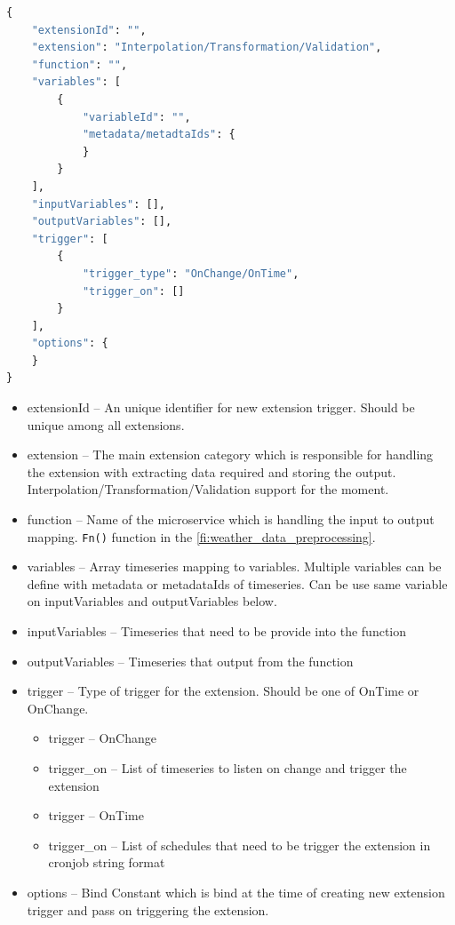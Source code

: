 \begin{lstlisting}[language=Python]
{
    "extensionId": "",
    "extension": "Interpolation/Transformation/Validation",
    "function": "",
    "variables": [
        {
            "variableId": "",
            "metadata/metadtaIds": {
            }
        }
    ],
    "inputVariables": [],
    "outputVariables": [],
    "trigger": [
        {
            "trigger_type": "OnChange/OnTime",
            "trigger_on": []
        }
    ],
    "options": {
    }
}
\end{lstlisting}
\begin{itemize}
    \item extensionId -- An unique identifier for new extension trigger. Should be unique among all extensions.
    \item extension -- The main extension category which is responsible for handling the extension with extracting data required and storing the output. Interpolation/Transformation/Validation support for the moment.
    \item function -- Name of the microservice which is handling the input to output mapping. \texttt{Fn()} function in the \cref{fi:weather_data_preprocessing}.
    \item variables -- Array timeseries mapping to variables. Multiple variables can be define with metadata or metadataIds of timeseries. Can be use same variable on inputVariables and outputVariables below.
    \item inputVariables -- Timeseries that need to be provide into the function
    \item outputVariables -- Timeseries that output from the function
    \item trigger -- Type of trigger for the extension. Should be one of OnTime or OnChange.
    \begin{itemize}
        \item trigger -- OnChange
        \item trigger\_on -- List of timeseries to listen on change and trigger the extension
    \end{itemize}
    \begin{itemize}
        \item trigger -- OnTime
        \item trigger\_on -- List of schedules that need to be trigger the extension in cronjob string format
    \end{itemize}
    \item options -- Bind Constant which is bind at the time of creating new extension trigger and pass on triggering the extension.
\end{itemize}

